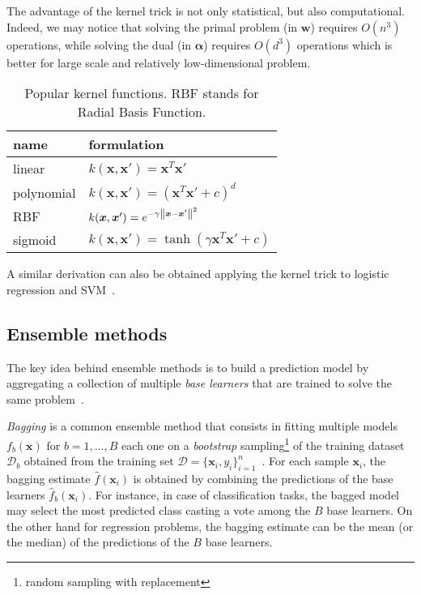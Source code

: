 			The advantage of the kernel trick is not only statistical, but also computational. Indeed, we may notice that solving the primal problem (\ie in $\bm{w}$) requires $O(n^3)$ operations, while solving the dual (\ie in $\bm{\alpha}$) requires $O(d^3)$ operations which is better for large scale and relatively low-dimensional problem.

		 \begin{table}[htb]
				\centering
				\caption{Popular kernel functions. \ac{RBF} stands for Radial Basis Function.}
				\label{tab:kernels}
				\begin{tabular}{@{}ll@{}}
					\toprule
					name       & formulation                                            \\ \midrule
					linear     & $k(\bm{x}, \bm{x}') =\bm{x}^T\bm{x}' $                               \\
					polynomial & $k(\bm{x},\bm{x}') = (\bm{x}^T\bm{x}' + c)^d$    \\
					RBF        & $k(\bm{x},\bm{x}') = e^{-\gamma\left\lVert\bm{x} - \bm{x}'\right\rVert^2}$ \\
					sigmoid    & $k(\bm{x},\bm{x}') = \tanh(\gamma \bm{x}^T\bm{x}' + c)$ \\ \bottomrule
				\end{tabular}
			\end{table}

			A similar derivation can also be obtained applying the kernel trick to logistic regression and SVM~\cite{bishop2006pattern, shawe2004kernel}.





	    \subsection{Ensemble methods}
	    The key idea behind ensemble methods is to build a prediction model by aggregating a collection of multiple \textit{base learners} that are trained to solve the same problem~\citep{zhou2012ensemble}.

	    \textit{Bagging} is a common ensemble method that consists in fitting multiple models $f_b(\bm{x})$ for $b=1,\dots,B$ each one on a \textit{bootstrap} sampling\footnote{random sampling with replacement} of the training dataset $\mathcal{D}_b$ obtained from the training set $\mathcal{D}=\{\bm{x}_i, y_i\}_{i=1}^n$~\citep{hastie2009elements}. For each sample $\bm{x}_i$, the bagging estimate $\hat{f}(\bm{x}_i)$ is obtained by combining the predictions of the base learners $\hat{f}_b(\bm{x}_i)$. For instance, in case of classification tasks, the bagged model may select the most predicted class casting a vote among the $B$ base learners. On the other hand for regression problems, the bagging estimate can be the mean (or the median) of the predictions of the $B$ base learners.

